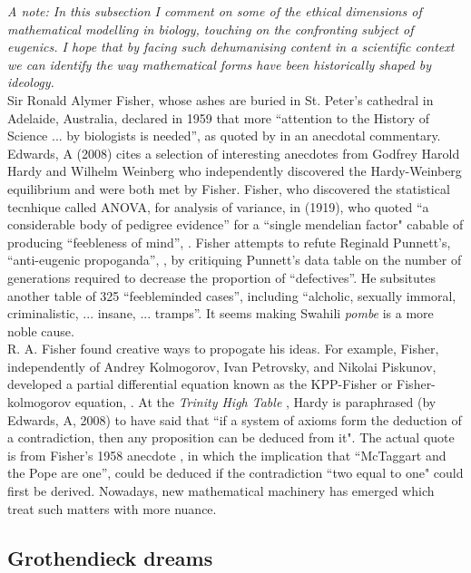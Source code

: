 \textit{A note: In this subsection I comment on 
some of the ethical dimensions of mathematical modelling in biology, 
touching on the confronting subject of eugenics. I hope that by facing 
such dehumanising content in a scientific context we 
can identify the way mathematical forms have been historically shaped by 
ideology.}
\\

Sir Ronald Alymer Fisher, whose ashes are buried in St. Peter's cathedral in Adelaide, Australia,
declared in 1959 that more ``attention to the History of Science ... by biologists is needed'',
as quoted by \cite{edwards2008gh} in an anecdotal commentary. Edwards, A (2008) cites
a selection of interesting anecdotes from Godfrey Harold Hardy and Wilhelm Weinberg who 
independently discovered the Hardy-Weinberg equilibrium and were both met by Fisher.
Fisher, who discovered the statistical tecnhique called ANOVA, for analysis of variance, in 
\cite{fisher1919xv} (1919), who quoted ``a considerable body of pedigree evidence'' for 
a ``single mendelian factor" cabable of producing ``feebleness of mind'', 
\cite{fisher1924elimination}. Fisher attempts to refute Reginald Punnett's, 
``anti-eugenic propoganda'', \cite{fisher1924elimination}, by critiquing
Punnett's data table on the number of generations required to decrease 
the proportion of ``defectives''. He subsitutes another table of 325 ``feebleminded cases'',
including ``alcholic, sexually immoral, criminalistic, ... insane, ... tramps''.
It seems making Swahili \textit{pombe} is a more noble cause.
\\

R. A. Fisher found creative ways to propogate his ideas. 
For example, Fisher, independently of Andrey Kolmogorov, Ivan Petrovsky, and Nikolai Piskunov,
developed a partial differential equation known as the KPP-Fisher or
Fisher-kolmogorov equation, \cite{fisher1937wave}. At the \textit{Trinity High Table}
, Hardy is paraphrased (by Edwards, A, 2008) to have said that ``if a system of axioms 
form the deduction of a contradiction, then any proposition can be deduced from it".
The actual quote is from Fisher's 1958 anecdote \cite{edwards2008gh}, 
in which the implication that ``McTaggart and the Pope are one'', 
could be deduced if the contradiction ``two equal to one" could first be derived. 
Nowadays, new mathematical machinery has emerged which 
treat such matters with more nuance.
\\

\subsection{Grothendieck dreams}

